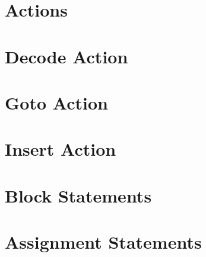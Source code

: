 \section{Actions} \label{action_guide}

\section{Decode Action} \label{decode_guide}

\section{Goto Action} \label{goto_guide}

\section{Insert Action} \label{insert_guide}

\section{Block Statements} \label{block_stmt_guide}

\section{Assignment Statements} \label{assign_stmt_guide}
